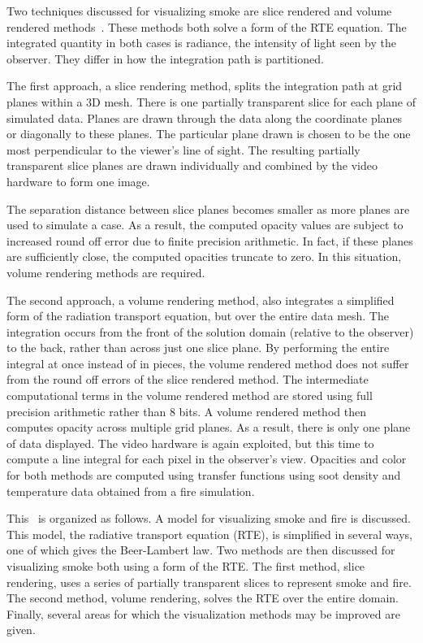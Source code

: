 Two techniques discussed for visualizing smoke are slice rendered
and volume rendered methods~\cite{levoy:1988,Engel:2006}.    These
methods both solve a form of the RTE equation.  The integrated
quantity in both cases is radiance, the intensity of light seen by
the observer.  They differ in how the integration path is
partitioned.

The first approach, a slice rendering method,  splits the
integration path at grid planes within a 3D mesh. There is one
partially transparent slice for each plane of simulated data.
Planes are drawn through the data along the coordinate planes or
diagonally to these  planes.   The particular plane drawn is
chosen to be the one most perpendicular to the viewer's line of
sight.  The resulting partially transparent slice planes are drawn
individually and combined by the video hardware to form one image.

The separation distance between slice planes becomes smaller as
more planes are used to simulate a case.  As a result, the
computed opacity values are subject to increased round off error
due to finite precision arithmetic.  In fact, if these planes are
sufficiently close, the computed opacities truncate to zero.   In
this situation, volume rendering methods are required.

The second approach, a volume rendering method, also integrates a
simplified form of the radiation transport equation, but over the
entire data mesh.  The integration occurs from the front of the
solution domain (relative to the observer) to the back, rather
than across just one slice plane. By performing the entire
integral at once instead of in pieces, the volume rendered method
does not suffer from the round off errors of the slice rendered
method.  The intermediate computational terms in the volume
rendered method are stored using full precision arithmetic rather
than 8 bits.  A volume rendered method then computes opacity
across multiple grid planes.  As a result, there is only one plane
of data displayed.  The video hardware is again exploited, but
this time to compute a line integral for each pixel in the
observer's view.  Opacities and color for both methods are
computed using transfer functions using soot density and
temperature data obtained from a fire simulation.

This \paper\ is organized as follows.  A model for visualizing
smoke and fire is discussed.  This model, the radiative transport
equation (RTE), is simplified in several ways, one of which gives
the Beer-Lambert law.  Two methods are then discussed for
visualizing smoke  both using a form of the RTE.  The first
method, slice rendering,  uses a series of partially transparent
slices to represent smoke and fire. The second method, volume
rendering, solves the RTE over the entire domain. Finally, several
areas for which the visualization methods may be improved are
given.

